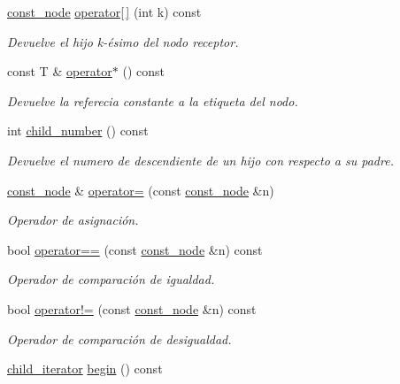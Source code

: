 \begin{DoxyCompactItemize}
\hyperlink{classktree_1_1const__node}{const\+\_\+node} \hyperlink{classktree_1_1const__node_a6711cc11e346fe968f5f26c04004b35b}{operator\mbox{[}$\,$\mbox{]}} (int k) const 
\begin{DoxyCompactList}\small\item\em Devuelve el hijo k-\/ésimo del nodo receptor. \end{DoxyCompactList}\item 
const T \& \hyperlink{classktree_1_1const__node_a5504e0c9fc74e59b5f5e98cccfc8d303}{operator$\ast$} () const 
\begin{DoxyCompactList}\small\item\em Devuelve la referecia constante a la etiqueta del nodo. \end{DoxyCompactList}\item 
int \hyperlink{classktree_1_1const__node_aabdf401a352faabcd6a20a548e241ae0}{child\+\_\+number} () const 
\begin{DoxyCompactList}\small\item\em Devuelve el numero de descendiente de un hijo con respecto a su padre. \end{DoxyCompactList}\item 
\hyperlink{classktree_1_1const__node}{const\+\_\+node} \& \hyperlink{classktree_1_1const__node_a23bede730b36b8f3938adf941764e3f6}{operator=} (const \hyperlink{classktree_1_1const__node}{const\+\_\+node} \&n)
\begin{DoxyCompactList}\small\item\em Operador de asignación. \end{DoxyCompactList}\item 
bool \hyperlink{classktree_1_1const__node_a11a4e91540318b17a5f040dc944e169b}{operator==} (const \hyperlink{classktree_1_1const__node}{const\+\_\+node} \&n) const 
\begin{DoxyCompactList}\small\item\em Operador de comparación de igualdad. \end{DoxyCompactList}\item 
bool \hyperlink{classktree_1_1const__node_aabbe0482477a231b752f94ff5a871a63}{operator!=} (const \hyperlink{classktree_1_1const__node}{const\+\_\+node} \&n) const 
\begin{DoxyCompactList}\small\item\em Operador de comparación de desigualdad. \end{DoxyCompactList}\item 
\hyperlink{classktree_1_1const__node_1_1child__iterator}{child\+\_\+iterator} \hyperlink{classktree_1_1const__node_a82daa356afc4fd6709342960efd40300}{begin} () const 

\end{DoxyCompactItemize}
